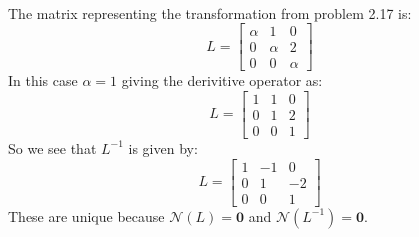 \documentclass[letterpaper,12pt]{article}
\theoremstyle{definition}
\begin{document}
\\

The matrix representing the transformation from problem 2.17 is:
\[L = 
    \begin{bmatrix}
        \alpha & 1 & 0 \\
        0 & \alpha & 2 \\
        0 & 0 & \alpha 
    \end{bmatrix}
\]
In this case $\alpha=1$ giving the derivitive operator as:
\[L = 
    \begin{bmatrix}
        1 & 1 & 0 \\
        0 & 1 & 2 \\
        0 & 0 & 1 
    \end{bmatrix}
\]
So we see that $L^{-1}$ is given by:
\[L = 
    \begin{bmatrix}
        1 & -1 & 0 \\
        0 & 1 & -2\\
        0 & 0 & 1 
    \end{bmatrix}
\]
These are unique because $\mathscr{N}(L) = \textbf{0}$ and $\mathscr{N}(L^{-1}) = \textbf{0}$.
\end{document}
